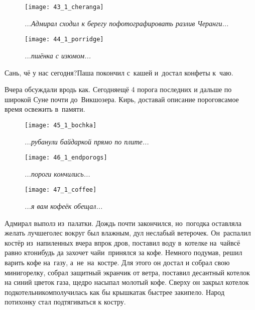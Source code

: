 \begin{figure}[h]
	\centering
	\texttt{[image: 43\_1\_cheranga]}
	\caption{\small\textit{...Адмирал сходил к берегу пофотографировать разлив Черанги...}}
\end{figure}

\newpage

\begin{wrapfigure}[12]{l}{0.48\textwidth}
	\centering
	\texttt{[image: 44\_1\_porridge]}
	\caption{\small\textit{...пшёнка с изюмом...}}
\end{wrapfigure}
\diagdash Сань, чё у нас сегодня?\mdash Паша покончил с~кашей и~достал конфеты к~чаю.

\diagdash Вчера обсуждали вродь как. Сегодня\mdash ещё 4 порога последних и дальше по широкой Суне почти до~Викшозера. Кирь, доставай описание порогов\mdash самое время освежить в~памяти.
\newpage

\begin{figure}[h]
	\centering
	\texttt{[image: 45\_1\_bochka]}
	\caption{\small\textit{...рубанули байдаркой прямо по плите...}}
\end{figure}

\newpage

\begin{figure}[h]
	\centering
	\texttt{[image: 46\_1\_endporogs]}
	\caption{\small\textit{...пороги кончились...}}
\end{figure}

\newpage

\begin{wrapfigure}[13]{l}{0.5\textwidth}
	\centering
	\texttt{[image: 47\_1\_coffee]}
	\caption{\small\textit{...я вам кофеёк обещал...}}
\end{wrapfigure}
Адмирал выполз из~палатки. Дождь почти закончился, но~погодка оставляла желать лучшего\mdash лес вокруг был влажным, дул неслабый ветерочек. Он~распалил костёр из~напиленных вчера впрок дров, поставил воду в~котелке на~чай\mdash всё равно кто\sdash нибудь да захочет чай\mdash и~принялся за кофе. Немного подумав, решил варить кофе на~газу, а~не~на~костре. Для этого он достал и собрал свою мини\sdash горелку, собрал защитный экранчик от ветра, поставил десантный котелок на синий цветок газа, щедро насыпал молотый кофе. Сверху он закрыл котелок подкотельником\mdash получилась как бы крышка\mdash так быстрее закипело. Народ потихонку стал подтягиваться к костру.

